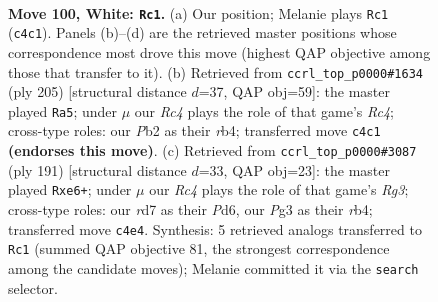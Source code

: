 \documentclass[11pt]{article}
\begin{document}
\begin{figure}[p]\centering
\begin{subfigure}{0.46\textwidth}\centering
\resizebox{\linewidth}{!}{%
\newchessgame
\chessboard[
  setfen={8/3r4/p2k4/P1p2p1p/1pR2P1P/4P1P1/1P4K1/8 w - - 11 100},
  showmover=false,
  pgfstyle=straightmove, color=movearrow, markmove={c4-c1}
]}
\caption{}
\end{subfigure}\hfill
\begin{subfigure}{0.46\textwidth}\centering
\resizebox{\linewidth}{!}{%
\newchessgame
\chessboard[
  setfen={8/2p5/3p2pk/2rPp1p1/1RP1P3/5P1P/5K2/8 b - - 24 103},
  showmover=false,
  pgfstyle=straightmove, color=movearrow, markmove={c5-a5}
]}
\caption{}
\end{subfigure}
\\[4pt]
\begin{subfigure}{0.46\textwidth}\centering
\resizebox{\linewidth}{!}{%
\newchessgame
\chessboard[
  setfen={4k3/4p3/p2pP1r1/P4p1p/1RP4P/4KPP1/8/8 b - - 0 96},
  showmover=false,
  pgfstyle=straightmove, color=movearrow, markmove={g6-e6}
]}
\caption{}
\end{subfigure}\hfill

\caption{\textbf{Move 100, White: \texttt{Rc1}.} (a) Our position; Melanie plays \texttt{Rc1} (\texttt{c4c1}). Panels (b)--(d) are the retrieved master positions whose correspondence most drove this move (highest QAP objective among those that transfer to it). (b) Retrieved from \texttt{ccrl\_top\_p0000\#1634} (ply 205) [structural distance $d$=37, QAP obj=59]: the master played \texttt{Ra5}; under $\mu$ our \emph{Rc4} plays the role of that game's \emph{Rc4}; cross-type roles: our \emph{P}b2 as their \emph{r}b4; transferred move \texttt{c4c1} \textbf{(endorses this move)}. (c) Retrieved from \texttt{ccrl\_top\_p0000\#3087} (ply 191) [structural distance $d$=33, QAP obj=23]: the master played \texttt{Rxe6+}; under $\mu$ our \emph{Rc4} plays the role of that game's \emph{Rg3}; cross-type roles: our \emph{r}d7 as their \emph{P}d6, our \emph{P}g3 as their \emph{r}b4; transferred move \texttt{c4e4}. Synthesis: 5 retrieved analogs transferred to \texttt{Rc1} (summed QAP objective 81, the strongest correspondence among the candidate moves); Melanie committed it via the \texttt{search} selector.}
\label{fig:thought-m198}
\end{figure}

\clearpage
\end{document}
